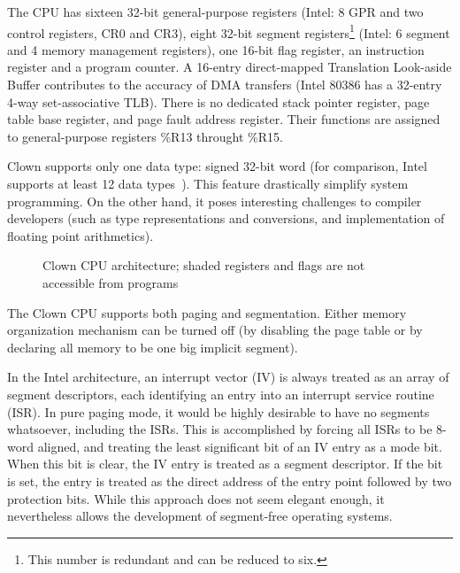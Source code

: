\documentclass[10pt,twoside]{article}
\begin{document}
The CPU has sixteen 32-bit general-purpose registers (Intel: 8 GPR and
two control registers, CR0 and CR3), eight 32-bit segment
registers\footnote{This number is redundant and can be reduced to
six.} (Intel: 6 segment and 4 memory management registers), one 16-bit
flag register, an instruction register and a program counter. A
16-entry direct-mapped Translation Look-aside Buffer contributes to
the accuracy of DMA transfers (Intel 80386 has a 32-entry 4-way
set-associative TLB). There is no dedicated stack pointer register,
page table base register, and page fault address register. Their
functions are assigned to general-purpose registers \%R13 throught
\%R15.

Clown supports only one data type: signed 32-bit word (for comparison,
Intel supports at least 12 data types~\cite{smith87}). This feature
drastically simplify system programming. On the other hand, it poses
interesting challenges to compiler developers (such as type
representations and conversions, and implementation of floating point
arithmetics).

\begin{figure}[tb!]\centering
{}
\caption{\label{cpu}Clown CPU architecture; shaded registers and flags
are not accessible from programs}
\end{figure}

The Clown CPU supports both paging and segmentation. Either memory
organization mechanism can be turned off (by disabling the page table
or by declaring all memory to be one big implicit segment).

In the Intel architecture, an interrupt vector (IV) is always treated
as an array of segment descriptors, each identifying an entry into an
interrupt service routine (ISR).  In pure paging mode, it would be
highly desirable to have no segments whatsoever, including the
ISRs. This is accomplished by forcing all ISRs to be 8-word aligned,
and treating the least significant bit of an IV entry as a mode
bit. When this bit is clear, the IV entry is treated as a segment
descriptor. If the bit is set, the entry is treated as the direct
address of the entry point followed by two protection bits. While this
approach does not seem elegant enough, it nevertheless allows the
development of segment-free operating systems.
\end{document}
